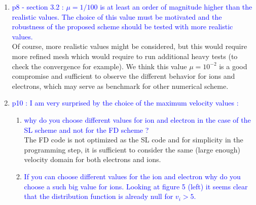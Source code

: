\documentclass{article}
\begin{document}
\begin{enumerate}
    \item \textcolor{blue}{p8 - section 3.2 : $\mu = 1/100$ is at least an order of magnitude higher than the realistic values. The choice of this value must be motivated and the robustness of the proposed scheme should be tested with more realistic values.} \\
    Of course, more realistic values might be considered, but this would require more refined mesh which would require 
    to run additional heavy tests (to check the convergence for example). We think this value $\mu=10^{-2}$ is a good compromise and sufficient 
    to observe the different behavior for ions and electrons, which may serve as benchmark for other numerical scheme. \\
    \item \textcolor{blue}{p10 : I am very surprised by the choice of the maximum velocity values :}
    \begin{enumerate}
\item \textcolor{blue}{ why do you choose different values for ion and electron in the case of the SL scheme
and not for the FD scheme ?} \\
The FD code is not optimized as the SL code and for simplicity in the programming step, 
it is sufficient to consider the same (large enough) velocity domain for both electrons and ions. \\
\item \textcolor{blue}{If you can choose different values for the ion and electron why do you choose a such big value for ions. Looking at figure 5 (left) it seems clear that the distribution function is already null for $v_i > 5$.}\\

\end{enumerate}
\end{enumerate}
\end{document}
